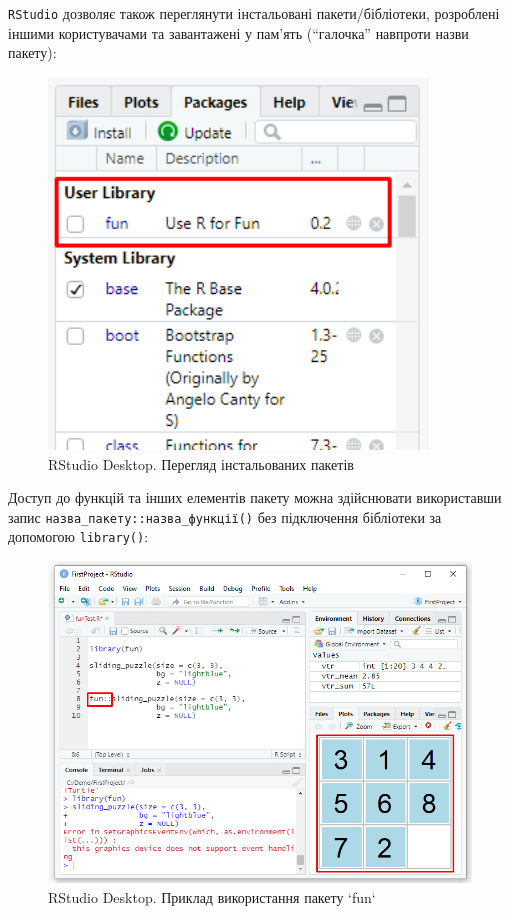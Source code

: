 \documentclass[
]{book}
\begin{document}
\texttt{RStudio} дозволяє також переглянути інстальовані пакети/бібліотеки, розроблені іншими користувачами та завантажені у пам'ять (``галочка'' навпроти назви пакету):

\begin{figure}
\includegraphics[width=3.97in]{images/chapter1/packages_3} \caption{RStudio Desktop. Перегляд інстальованих пакетів}\label{fig:unnamed-chunk-33}
\end{figure}

Доступ до функцій та інших елементів пакету можна здійснювати використавши запис \texttt{назва\_пакету::назва\_функції()} без підключення бібліотеки за допомогою \texttt{library()}:

\begin{figure}
\includegraphics[width=10.62in]{images/chapter1/packages_4} \caption{RStudio Desktop. Приклад використання пакету `fun`}\label{fig:unnamed-chunk-34}
\end{figure}
\end{document}
